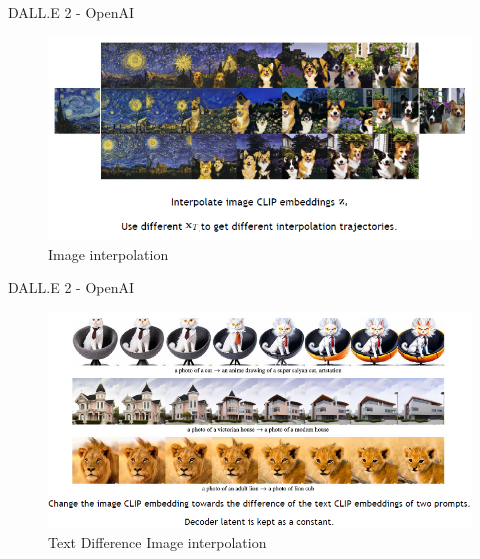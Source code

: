 \begin{frame}{DALL.E 2 - OpenAI}
\begin{figure}
    \centering
    \includegraphics[height=0.8\textheight, width=\textwidth, keepaspectratio]{images/diffusion/diff_results_5.png}
    \caption{Image interpolation}
\end{figure}


\end{frame}

\begin{frame}{DALL.E 2 - OpenAI}
\begin{figure}
    \centering
    \includegraphics[height=0.8\textheight, width=\textwidth, keepaspectratio]{images/diffusion/diff_results_6.png}
    \caption{Text Difference Image interpolation}
\end{figure}


\end{frame}